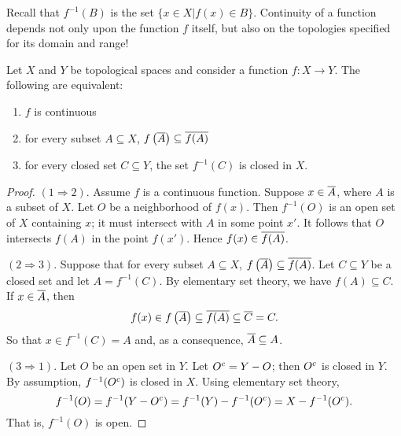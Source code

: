 Recall that $f^{-1}(B)$ is the set $\{ x \in X | f(x) \in B \}$.
Continuity of a function depends not only upon the function $f$ itself, but also on the topologies specified for its domain and range!

\begin{theorem} \label{theorem:ContinuityEquivalentConditions}
Let $X$ and $Y$ be topological spaces and consider a function $f: X \rightarrow Y$.
The following are equivalent:
\begin{enumerate}
\item $f$ is continuous
\item for every subset $A \subseteq X$, $f \left( \overline{A} \right) \subseteq \overline{ f(A) }$
\item for every closed set $C \subseteq Y$, the set $f^{-1} (C)$ is closed in $X$.
\end{enumerate}
\end{theorem}
\begin{proof}
$(1 \Rightarrow 2)$.
Assume $f$ is a continuous function.
Suppose $x \in \overline{A}$, where $A$ is a subset of $X$.
Let $O$ be a neighborhood of $f(x)$.
Then $f^{-1}(O)$ is an open set of $X$ containing $x$; it must intersect with $A$ in some point $x'$.
It follows that $O$ intersects $f(A)$ in the point $f(x')$.
Hence $f(x) \in \overline{ f(A) }$.

$(2 \Rightarrow 3)$.
Suppose that for every subset $A \subseteq X$, $f \left( \overline{A} \right) \subseteq \overline{ f(A) }$.
Let $C \subseteq Y$ be a closed set and let $A = f^{-1} (C)$.
By elementary set theory, we have $f(A) \subseteq C$.
If $x \in \overline{A}$, then
\begin{equation*}
f(x) \in f \left( \overline{A} \right) \subseteq \overline{f (A)} \subseteq \overline{C} = C.
\end{equation*}
So that $x \in f^{-1} (C) = A$ and, as a consequence, $\overline{A} \subseteq A$.

$(3 \Rightarrow 1)$.
Let $O$ be an open set in $Y$.
Let ${O}^{c} = Y - O$; then ${O}^{c}$ is closed in $Y$.
By assumption, $f^{-1} ({O}^{c})$ is closed in $X$.
Using elementary set theory,
\begin{equation*}
f^{-1} (O) = f^{-1} (Y - {O}^{c}) = f^{-1}(Y) - f^{-1}({O}^{c}) = X - f^{-1}({O}^{c}).
\end{equation*}
That is, $f^{-1} (O)$ is open.
\end{proof}

